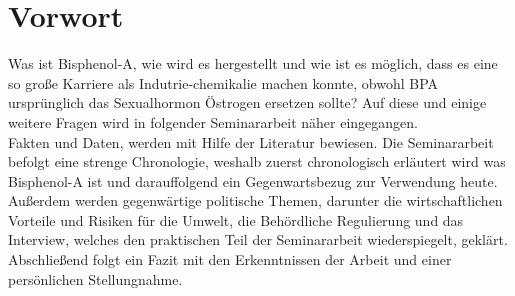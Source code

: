 \section{Vorwort}
Was ist Bisphenol-A, wie wird es hergestellt und wie ist es möglich, dass es eine
so große Karriere als Indutrie-chemikalie machen konnte, obwohl BPA ursprünglich
das Sexualhormon \glqq Östrogen\grqq{} ersetzen sollte?
Auf diese und einige weitere Fragen wird in folgender Seminararbeit näher eingegangen.
\\Fakten und Daten, werden mit Hilfe der Literatur bewiesen.
Die Seminararbeit befolgt eine strenge Chronologie, weshalb zuerst chronologisch
erläutert wird was Bisphenol-A ist und darauffolgend ein Gegenwartsbezug zur
Verwendung heute. Außerdem werden gegenwärtige politische Themen, darunter die wirtschaftlichen
Vorteile und Risiken für die Umwelt, die Behördliche Regulierung und das Interview, welches den praktischen Teil der Seminararbeit
wiederspiegelt, geklärt.
Abschließend folgt ein Fazit mit den Erkenntnissen der Arbeit und einer persönlichen Stellungnahme.
